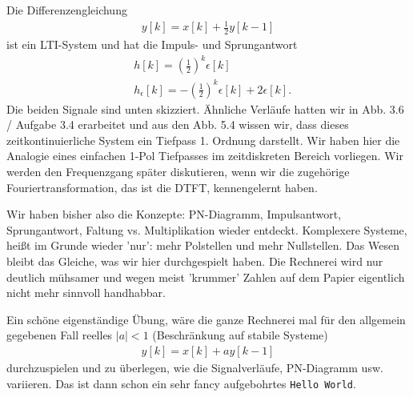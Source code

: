 \begin{Loesung}
Die Differenzengleichung
\begin{align}
y[k] = x[k] + \frac{1}{2} y[k-1]
\end{align}
ist ein LTI-System und hat die Impuls- und Sprungantwort
\begin{align}
&h[k] = (\frac{1}{2})^k \epsilon[k]\\
&h_\epsilon[k] = - (\frac{1}{2})^k \epsilon[k] + 2 \epsilon[k].
\end{align}
Die beiden Signale sind unten skizziert. Ähnliche Verläufe hatten wir in
Abb. 3.6 / Aufgabe 3.4 erarbeitet und aus den Abb. 5.4 wissen wir, dass dieses
zeitkontinuierliche System ein Tiefpass 1. Ordnung darstellt.
%
Wir haben hier die Analogie eines einfachen 1-Pol Tiefpasses im zeitdiskreten
Bereich vorliegen. Wir werden den Frequenzgang später diskutieren, wenn
wir die zugehörige Fouriertransformation, das ist die DTFT, kennengelernt haben.
%
%
Wir haben bisher also die Konzepte: PN-Diagramm, Impulsantwort, Sprungantwort,
Faltung vs. Multiplikation wieder entdeckt.
%
Komplexere Systeme, heißt im Grunde wieder 'nur': mehr Polstellen und mehr
Nullstellen. Das Wesen bleibt das Gleiche, was wir hier durchgespielt
haben. Die Rechnerei wird nur deutlich mühsamer und wegen meist 'krummer' Zahlen
auf dem Papier eigentlich nicht mehr sinnvoll handhabbar.

Ein schöne eigenständige Übung, wäre die ganze Rechnerei mal für den allgemein
gegebenen Fall reelles $|a|<1$ (Beschränkung auf stabile Systeme)
\begin{align}
y[k] = x[k] + a y[k-1]
\end{align}
durchzuspielen und zu überlegen, wie die Signalverläufe, PN-Diagramm usw.
variieren. Das ist dann schon ein sehr fancy aufgebohrtes \texttt{Hello World}.
\end{Loesung}


